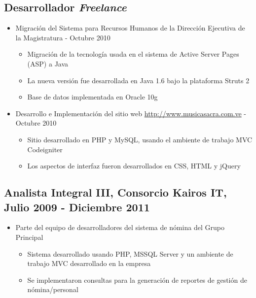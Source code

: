 \documentclass[letterpaper,11pt]{report}
\begin{document}
\subsection*{Desarrollador \emph{Freelance}}
\begin{itemize}
\item Migración del Sistema para Recursos Humanos de la Dirección Ejecutiva de la Magistratura - Octubre 2010
	\begin{itemize}
	\item Migración de la tecnología usada en el sistema de Active Server Pages (ASP) a Java
	\item La nueva versión fue desarrollada en Java 1.6 bajo la plataforma Struts 2
	\item Base de datos implementada en Oracle 10g
	\end{itemize}
\item Desarrollo e Implementación del sitio web \url{http://www.musicasacra.com.ve} - Octubre 2010
	\begin{itemize}
		\item Sitio desarrollado en PHP y MySQL, usando el ambiente de trabajo MVC Codeigniter
		\item Los aspectos de interfaz fueron desarrollados en CSS, HTML y jQuery
	\end{itemize}
\end{itemize}

\subsection*{Analista Integral III, Consorcio Kairos IT, Julio 2009 - Diciembre 2011}

\begin{itemize}
\item Parte del equipo de desarrolladores del sistema de nómina del Grupo Principal
  \begin{itemize}
    \item Sistema desarrollado usando PHP, MSSQL Server y un ambiente de trabajo MVC desarrollado en la empresa
    \item Se implementaron consultas para la generación de reportes de gestión de nómina/personal
  \end{itemize}
\end{itemize}
\end{document}
